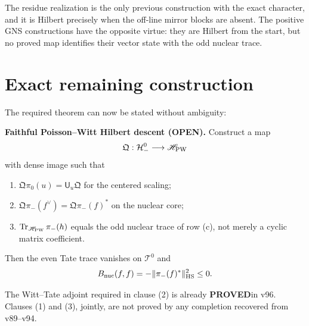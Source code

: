 \documentclass[11pt]{article}
\newcommand{\PROVED}{\textcolor{green!40!black}{\textbf{PROVED}}}
\newcommand{\OPEN}{\textcolor{red!70!black}{\textbf{OPEN}}}
\begin{document}
The residue realization is the only previous construction with the exact
character, and it is Hilbert precisely when the off-line mirror blocks are
absent.  The positive GNS constructions have the opposite virtue: they are
Hilbert from the start, but no proved map identifies their vector state with
the odd nuclear trace.

\section{Exact remaining construction}

The required theorem can now be stated without ambiguity:

\medskip
\noindent\textbf{Faithful Poisson--Witt Hilbert descent (\OPEN).}
Construct a map
\[
 \mathfrak Q:\mathcal H_-^0\longrightarrow\mathscr H_{\rm PW}
\]
with dense image such that
\begin{enumerate}
\item $\mathfrak Q\pi_0(u)=\mathsf U_u\mathfrak Q$ for the centered scaling;
\item $\mathfrak Q\pi_-(f^\vee)=\mathfrak Q\pi_-(f)^*$ on the nuclear core;
\item $\operatorname{Tr}_{\mathscr H_{\rm PW}}\pi_-(h)$ equals the odd
      nuclear trace of row (c), not merely a cyclic matrix coefficient.
\end{enumerate}
Then the even Tate trace vanishes on $\mathcal T^0$ and
\[
 B_{\rm nuc}(f,f)
 =-\|\pi_-(f)^*\|_{\rm HS}^2\le0.
\]

The Witt--Tate adjoint required in clause (2) is already \PROVED in v96.
Clauses (1) and (3), jointly, are not proved by any completion recovered from
v89--v94.
\end{document}

